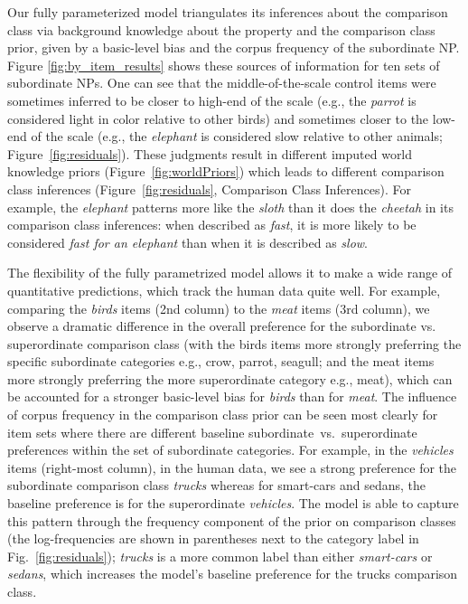 \documentclass[doc, floatsintext]{apa6}
\begin{document}
Our fully parameterized model triangulates its inferences about the comparison class via background knowledge about the property and the comparison class prior, given by a basic-level bias and the corpus frequency of the subordinate NP. Figure \ref{fig:by_item_results} shows these sources of information for ten sets of subordinate NPs. 
One can see that the middle-of-the-scale control items were sometimes inferred to be closer to high-end of the scale (e.g., the \emph{parrot} is considered light in color relative to other birds) and sometimes closer to the low-end of the scale (e.g., the \emph{elephant} is considered slow relative to other animals; Figure~\ref{fig:residuals}). These judgments result in different imputed  world knowledge priors (Figure~\ref{fig:worldPriors}) which leads to different comparison class inferences (Figure~\ref{fig:residuals}, Comparison Class Inferences). For example, the \emph{elephant} patterns more like the \emph{sloth} than it does the \emph{cheetah} in its comparison class inferences: when described as \emph{fast}, it is more likely to be considered \emph{fast for an elephant} than when it is described as \emph{slow}.

The flexibility of the fully parametrized model allows it to make a wide range of quantitative predictions, which track the human data quite well. For example, comparing the \emph{birds} items (2nd column) to the \emph{meat} items (3rd column), we observe a dramatic difference in the overall preference for the subordinate vs. superordinate comparison class (with the birds items more strongly preferring the specific subordinate categories e.g., crow, parrot, seagull; and the meat items more strongly preferring the more superordinate category e.g., meat), which can be accounted for a stronger basic-level bias for \emph{birds} than for \emph{meat}. 
The influence of corpus frequency in the comparison class prior can be seen most clearly for item sets where there are different baseline subordinate~vs.~superordinate preferences within the set of subordinate categories. For example, in the \emph{vehicles} items (right-most column), in the human data, we see a strong preference for the subordinate comparison class \emph{trucks} whereas for smart-cars and sedans, the baseline preference is for the superordinate \emph{vehicles}. The model is able to capture this pattern through the frequency component of the prior on comparison classes (the log-frequencies are shown in parentheses next to the category label in Fig.~\ref{fig:residuals}); \emph{trucks} is a more common label than either \emph{smart-cars} or \emph{sedans}, which increases the model’s baseline preference for the trucks comparison class. 
\end{document}
